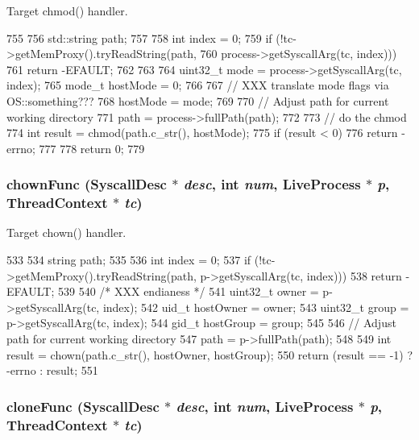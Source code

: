 Target chmod() handler. 


\begin{DoxyCode}
755 {
756     std::string path;
757 
758     int index = 0;
759     if (!tc->getMemProxy().tryReadString(path,
760                 process->getSyscallArg(tc, index))) {
761         return -EFAULT;
762     }
763 
764     uint32_t mode = process->getSyscallArg(tc, index);
765     mode_t hostMode = 0;
766 
767     // XXX translate mode flags via OS::something???
768     hostMode = mode;
769 
770     // Adjust path for current working directory
771     path = process->fullPath(path);
772 
773     // do the chmod
774     int result = chmod(path.c_str(), hostMode);
775     if (result < 0)
776         return -errno;
777 
778     return 0;
779 }
\end{DoxyCode}
\hypertarget{syscall__emul_8hh_a30e4f3dddc7a190609b40155566eb23f}{
\subsubsection[{chownFunc}]{ chownFunc ({\bf SyscallDesc} $\ast$ {\em desc}, \/  int {\em num}, \/  {\bf LiveProcess} $\ast$ {\em p}, \/  {\bf ThreadContext} $\ast$ {\em tc})}}
\label{syscall__emul_8hh_a30e4f3dddc7a190609b40155566eb23f}


Target chown() handler. 


\begin{DoxyCode}
533 {
534     string path;
535 
536     int index = 0;
537     if (!tc->getMemProxy().tryReadString(path, p->getSyscallArg(tc, index)))
538         return -EFAULT;
539 
540     /* XXX endianess */
541     uint32_t owner = p->getSyscallArg(tc, index);
542     uid_t hostOwner = owner;
543     uint32_t group = p->getSyscallArg(tc, index);
544     gid_t hostGroup = group;
545 
546     // Adjust path for current working directory
547     path = p->fullPath(path);
548 
549     int result = chown(path.c_str(), hostOwner, hostGroup);
550     return (result == -1) ? -errno : result;
551 }
\end{DoxyCode}
\hypertarget{syscall__emul_8hh_ab1bb56414754dce4db93e9df10b8c2f7}{
\subsubsection[{cloneFunc}]{ cloneFunc ({\bf SyscallDesc} $\ast$ {\em desc}, \/  int {\em num}, \/  {\bf LiveProcess} $\ast$ {\em p}, \/  {\bf ThreadContext} $\ast$ {\em tc})}}
\label{syscall__emul_8hh_ab1bb56414754dce4db93e9df10b8c2f7}


